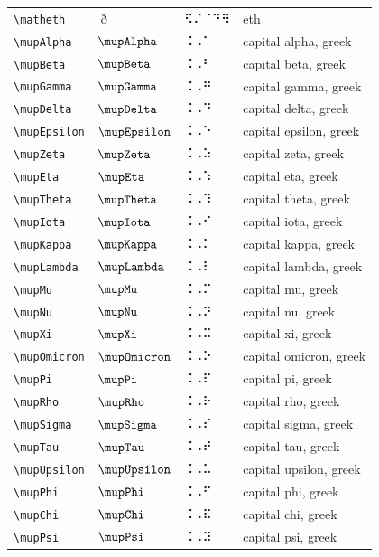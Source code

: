 \documentclass[oneside]{article}
\begin{document}
\begin{longtable}{llll}
\verb|\matheth| & $\matheth$ &  ⠫⠌⠈⠙⠻  & {eth} \\[2ex]
\verb|\mupAlpha| & $\mupAlpha$ &  ⠨⠠⠁  & {capital alpha, greek} \\[2ex]
\verb|\mupBeta| & $\mupBeta$ &  ⠨⠠⠃  & {capital beta, greek} \\[2ex]
\verb|\mupGamma| & $\mupGamma$ &  ⠨⠠⠛  & {capital gamma, greek} \\[2ex]
\verb|\mupDelta| & $\mupDelta$ &  ⠨⠠⠙  & {capital delta, greek} \\[2ex]
\verb|\mupEpsilon| & $\mupEpsilon$ &  ⠨⠠⠑  & {capital epsilon, greek} \\[2ex]
\verb|\mupZeta| & $\mupZeta$ &  ⠨⠠⠵  & {capital zeta, greek} \\[2ex]
\verb|\mupEta| & $\mupEta$ &  ⠨⠠⠱  & {capital eta, greek} \\[2ex]
\verb|\mupTheta| & $\mupTheta$ &  ⠨⠠⠹  & {capital theta, greek} \\[2ex]
\verb|\mupIota| & $\mupIota$ &  ⠨⠠⠊  & {capital iota, greek} \\[2ex]
\verb|\mupKappa| & $\mupKappa$ &  ⠨⠠⠅  & {capital kappa, greek} \\[2ex]
\verb|\mupLambda| & $\mupLambda$ &  ⠨⠠⠇  & {capital lambda, greek} \\[2ex]
\verb|\mupMu| & $\mupMu$ &  ⠨⠠⠍  & {capital mu, greek} \\[2ex]
\verb|\mupNu| & $\mupNu$ &  ⠨⠠⠝  & {capital nu, greek} \\[2ex]
\verb|\mupXi| & $\mupXi$ &  ⠨⠠⠭  & {capital xi, greek} \\[2ex]
\verb|\mupOmicron| & $\mupOmicron$ &  ⠨⠠⠕  & {capital omicron, greek} \\[2ex]
\verb|\mupPi| & $\mupPi$ &  ⠨⠠⠏  & {capital pi, greek} \\[2ex]
\verb|\mupRho| & $\mupRho$ &  ⠨⠠⠗  & {capital rho, greek} \\[2ex]
\verb|\mupSigma| & $\mupSigma$ &  ⠨⠠⠎  & {capital sigma, greek} \\[2ex]
\verb|\mupTau| & $\mupTau$ &  ⠨⠠⠞  & {capital tau, greek} \\[2ex]
\verb|\mupUpsilon| & $\mupUpsilon$ &  ⠨⠠⠥  & {capital upsilon, greek} \\[2ex]
\verb|\mupPhi| & $\mupPhi$ &  ⠨⠠⠋  & {capital phi, greek} \\[2ex]
\verb|\mupChi| & $\mupChi$ &  ⠨⠠⠯  & {capital chi, greek} \\[2ex]
\verb|\mupPsi| & $\mupPsi$ &  ⠨⠠⠽  & {capital psi, greek} \\[2ex]

\end{longtable}
\end{document}
